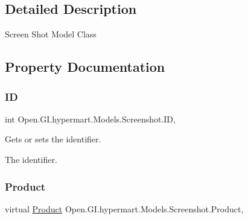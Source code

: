 \subsection{Detailed Description}
Screen Shot Model Class 



\subsection{Property Documentation}
\hypertarget{class_open_1_1_g_i_1_1hypermart_1_1_models_1_1_screenshot_a7460fabffe75a362966595c8b86cdef2}{}\label{class_open_1_1_g_i_1_1hypermart_1_1_models_1_1_screenshot_a7460fabffe75a362966595c8b86cdef2} 
\subsubsection{\texorpdfstring{ID}{ID}}
{\footnotesize\ttfamily int Open.\+G\+I.\+hypermart.\+Models.\+Screenshot.\+ID\hspace{0.3cm}{\ttfamily [get]}, {\ttfamily [set]}}



Gets or sets the identifier. 

The identifier. \hypertarget{class_open_1_1_g_i_1_1hypermart_1_1_models_1_1_screenshot_a8aed1d2289db7caefe8c7e14e0f5cc50}{}\label{class_open_1_1_g_i_1_1hypermart_1_1_models_1_1_screenshot_a8aed1d2289db7caefe8c7e14e0f5cc50} 
\subsubsection{\texorpdfstring{Product}{Product}\hspace{0.1cm}{\footnotesize\ttfamily [1/2]}}
{\footnotesize\ttfamily virtual \hyperlink{class_open_1_1_g_i_1_1hypermart_1_1_models_1_1_product}{Product} Open.\+G\+I.\+hypermart.\+Models.\+Screenshot.\+Product\hspace{0.3cm}{\ttfamily [get]}, {\ttfamily [set]}}

\hypertarget{class_open_1_1_g_i_1_1hypermart_1_1_models_1_1_screenshot_ae4e4b60e07136a6c4debe888426d6f6b}{}\label{class_open_1_1_g_i_1_1hypermart_1_1_models_1_1_screenshot_ae4e4b60e07136a6c4debe888426d6f6b} 
